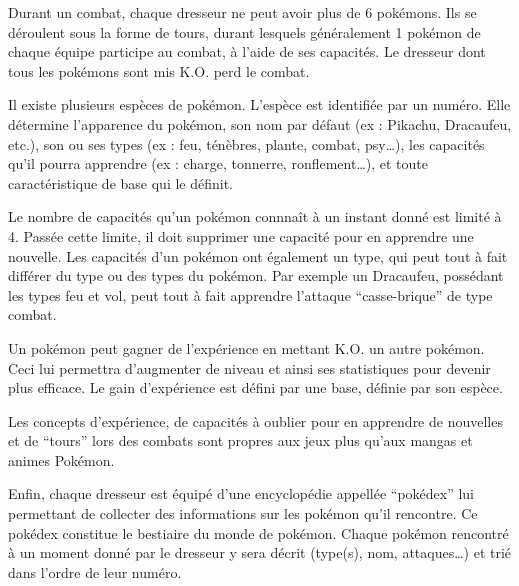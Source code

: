 Durant un combat, chaque dresseur ne peut avoir plus de 6 pokémons. Ils se déroulent sous la forme de tours, durant lesquels généralement 1 pokémon de chaque équipe participe au combat, à l’aide de ses capacités. Le dresseur dont tous les pokémons sont mis K.O. perd le combat.

Il existe plusieurs espèces de pokémon. L’espèce est identifiée par un numéro. Elle détermine l’apparence du pokémon, son nom par défaut (ex : Pikachu, Dracaufeu, etc.), son ou ses types (ex : feu, ténèbres, plante, combat, psy…), les capacités qu’il pourra apprendre (ex : charge, tonnerre, ronflement…), et toute caractéristique de base qui le définit.

Le nombre de capacités qu’un pokémon connnaît à un instant donné est limité à 4. Passée cette limite, il doit supprimer une capacité pour en apprendre une nouvelle. Les capacités d’un pokémon ont également un type, qui peut tout à fait différer du type ou des types du pokémon. Par exemple un Dracaufeu, possédant les types feu et vol, peut tout à fait apprendre l’attaque “casse-brique” de type combat.

Un pokémon peut gagner de l’expérience en mettant K.O. un autre pokémon. Ceci lui permettra d’augmenter de niveau et ainsi ses statistiques pour devenir plus efficace. Le gain d’expérience est défini par une base, définie par son espèce.

Les concepts d’expérience, de capacités à oublier pour en apprendre de nouvelles et de “tours” lors des combats sont propres aux jeux plus qu’aux mangas et animes Pokémon.

Enfin, chaque dresseur est équipé d’une encyclopédie appellée “pokédex” lui permettant de collecter des informations sur les pokémon qu’il rencontre. Ce pokédex constitue le bestiaire du monde de pokémon. Chaque pokémon rencontré à un moment donné par le dresseur y sera décrit (type(s), nom, attaques…) et trié dans l’ordre de leur numéro.